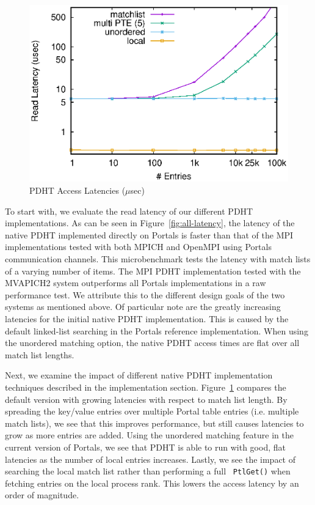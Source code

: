 \begin{figure}[ht]
  \center
  \includegraphics[width=.95\linewidth]{plots/pdhtlatency}
  \caption{PDHT Access Latencies ($\mu$sec)}
  \label{fig:pdht-latency}
\end{figure}


To start with, we evaluate the read latency of our different PDHT
implementations. As can be seen in Figure~\ref{fig:all-latency}, the latency of
the native PDHT implemented directly on Portals is faster than that of the MPI
implementations tested with both MPICH and OpenMPI using Portals communication
channels. This microbenchmark tests the latency with match lists of a varying
number of items. The MPI PDHT implementation tested with the MVAPICH2 system
outperforms all Portals implementations in a raw performance test. We attribute
this to the different design goals of the two systems as mentioned above. Of
particular note are the greatly increasing latencies for the initial native
PDHT implementation. This is caused by the default linked-list searching in the
Portals reference implementation. When using the unordered matching option, the
native PDHT access times are flat over all match list lengths.


Next, we examine the impact of different native PDHT implementation techniques
described in the implementation section. Figure~\ref{fig:pdht-latency} compares
the default version with growing latencies with respect to match list length.
By spreading the key/value entries over multiple Portal table entries (i.e.
multiple match lists), we see that this improves performance, but still causes
latencies to grow as more entries are added. Using the unordered matching
feature in the current version of Portals, we see that PDHT is able to run with
good, flat latencies as the number of local entries increases. Lastly, we see
the impact of searching the local match list rather than performing a full {\tt
  PtlGet()} when fetching entries on the local process rank. This lowers the
access latency by an order of magnitude.

